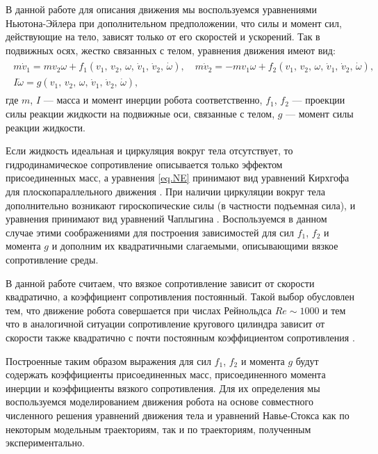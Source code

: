 В данной работе для описания движения мы воспользуемся уравнениями Ньютона-Эйлера при дополнительном предположении, что силы и момент сил, действующие на тело, зависят только от его скоростей и ускорений. Так в подвижных осях, жестко связанных с телом, уравнения движения имеют вид:
\begin{gather}
\begin{gathered}
m \dot{v}_1 = m v_2 \omega + f_1 (v_1,\, v_2,\, \omega,\, \dot{v}_1,\, \dot{v}_2,\, \dot \omega),\quad m \dot{v}_2 = -m v_1 \omega + f_2 (v_1,\, v_2,\, \omega,\, \dot{v}_1,\, \dot{v}_2,\, \dot \omega),\\
I \dot{\omega} = g (v_1,\, v_2,\, \omega,\, \dot{v}_1,\, \dot{v}_2,\, \dot \omega),
\end{gathered}\label{eq.NE}
\end{gather}
где $m$, $I$ --- масса и момент инерции робота соответственно, $f_1$, $f_2$ --- проекции силы реакции жидкости на подвижные оси, связанные с телом, $g$ --- момент силы реакции жидкости. 

Если жидкость идеальная и циркуляция вокруг тела отсутствует, то гидродинамическое сопротивление описывается только эффектом присоединенных масс, а уравнения \eqref{eq.NE} принимают вид уравнений Кирхгофа для плоскопараллельного движения \cite{Kirchhoff}. При наличии циркуляции вокруг тела дополнительно возникают гироскопические силы (в частности подъемная сила), и уравнения принимают вид уравнений Чаплыгина \cite{Borisov_Mamaev, Chaplygin}. Воспользуемся в данном случае этими соображениями для построения зависимостей для сил $f_1$, $f_2$ и момента $g$ и дополним их квадратичными слагаемыми, описывающими вязкое сопротивление среды.

В данной работе считаем, что вязкое сопротивление зависит от скорости квадратично, а коэффициент сопротивления постоянный. Такой выбор обусловлен тем, что движение робота совершается при числах Рейнольдса $Re \sim 1000$ и тем что в аналогичной ситуации сопротивление кругового цилиндра зависит от скорости также квадратично с почти постоянным коэффициентом сопротивления \cite{Schlichting}.

Построенные таким образом выражения для сил $f_1$, $f_2$ и момента $g$ будут содержать коэффициенты присоединенных масс, присоединенного момента инерции и коэффициенты вязкого сопротивления. Для их определения мы воспользуемся моделированием движения робота на основе совместного численного решения уравнений движения тела и уравнений Навье-Стокса как по некоторым модельным траекториям, так и по траекториям, полученным экспериментально.


